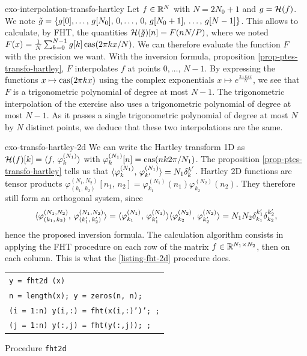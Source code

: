  
\begin{correction}{exo-interpolation-transfo-hartley}
 Let $ f \in \mathbb{R}^N $ with $ N = 2N_0+1 $ and $ g = \mathcal{H} (f) $. We note $ \tilde{g} = \{g [0], \ldots, \, g [N_0], \, 0, \ldots, \, 0, \, g [N_0+1], \, \ldots , \, g [N-1]\} $. This allows to calculate, by FHT, the quantities $ \mathcal{H} (\tilde{g}) [n] = F (n N/P) $, where we noted $ F (x) = \frac{1}{N} \sum_{k = 0}^{N-1}{g [k] \operatorname{cas} (2 \pi kx/N)} $. We can therefore evaluate the function $ F $ with the precision we want. With the inversion formula, proposition \ref{prop-ptes-transfo-hartley}, $ F $ interpolates $ f $ at points $ 0, \ldots, \, N-1 $. By expressing the functions $ x \mapsto \operatorname{cas} (2 \pi kx) $ using the complex exponentials $ x \mapsto e^{\frac{2 \imath kx \pi}{N}} $, we see that $ F $ is a trigonometric polynomial of degree at most $ N-1 $. The trigonometric interpolation of the exercise  also uses a trigonometric polynomial of degree at most $ N-1 $. As it passes a single trigonometric polynomial of degree at most $ N $ by $ N $ distinct points, we deduce that these two interpolations are the same.
\end{correction}
 
 
\begin{correction}{exo-transfo-hartley-2d}
 We can write the Hartley transform 1D as $ \mathcal{H} (f) [k] = \langle f,\,\varphi_k^{(N_1)}\rangle $ with $ \varphi_k^{(N_1 )}[n] = \operatorname{cas} (nk 2 \pi/N_1) $. The proposition \ref{prop-ptes-transfo-hartley} tells us that $ \langle \varphi_k^{(N_1)},\,\varphi_{k'}^{(N_1)}\rangle = N_1 \delta_k^{k'} $. Hartley 2D functions are tensor products $ \varphi_{(k_1, \, k_2)}^{(N_1, N_2)}[n_1, \, n_2] = \varphi_{k_1}^{(N_1)} (n_1 ) \varphi_{k_2}^{(N_2)} (n_2) $. They therefore still form an orthogonal system, since
\begin{equation*}
\langle \varphi_{(k_1, \, k_2)}^{(N_1, N_2)},\,\varphi_{(k_1', \, k_2')}^{(N_1, N_2)}\rangle = \langle \varphi_{k_1}^{(N_1)},\,\varphi_{k_1'}^{(N_1)}\rangle \langle \varphi_{k_2}^{(N_2)},\,\varphi_{k_2'}^{(N_2)}\rangle = N_1 N_2 \delta_{k_1}^{k_1'} \delta_{k_2}^{k_2'},
\end{equation*}
hence the proposed inversion formula. The calculation algorithm consists in applying the FHT procedure on each row of the matrix $ f \in \mathbb{R}^{N_1 \times N_2} $, then on each column. This is what the \ref{listing-fht-2d} procedure does.

\begin{listing} 
\begin{footnotesize}
{\upshape
\begin{tabular}{l} \texttt{\pfunction y = fht2d (x)} \\
\texttt{n = length(x); y = zeros(n, n);} \\
\texttt{\pfor{}(i = 1:n) y(i,:) = fht(x(i,:)')'; \pend{};} \\
\texttt{\pfor{}(j = 1:n) y(:,j) = fht(y(:,j)); \pend{};} \\
\end{tabular}
}
\end{footnotesize}
\caption{Procedure \texttt{\upshape fht2d}}
\label{listing-fht-2d}
\end{listing}
\end{correction}
 
